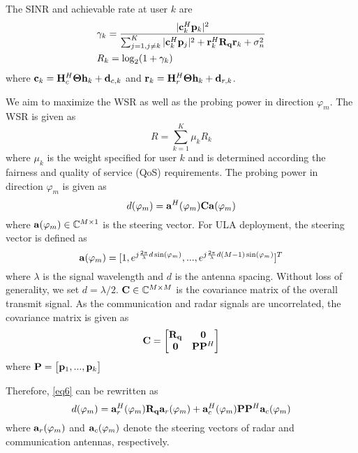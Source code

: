 The SINR and achievable rate at user $k$ are
\begin{align}
    &\gamma_k=\frac{|{\bf c}_k^H {\bf p}_k|^2}{\sum_{j=1,j \neq k}^K |{\bf c}_k^H {\bf p}_j|^2 + {\bf r}_k^H {\bf R}_{\bf q} {\bf r}_k + \sigma^2_n}\\
    &R_k = \log_2 ( 1 + \gamma_k )
\end{align}
where ${\bf c}_k = \mathbf{H}_c^H \mathbf{\Theta} \mathbf{h}_k+ {\bf d}_{c,k}$
and ${\bf r}_k= \mathbf{H}_r^H \mathbf{\Theta} \mathbf{h}_k + {\bf d}_{r,k}$.

We aim to maximize the WSR as well as the probing power in
direction $\varphi_m$. The WSR is given as
\begin{equation}
    R = \sum_{k=1}^K \mu_k R_k \label{eq5}
\end{equation}
where $\mu_k$ is the weight specified for user $k$ and is determined according the fairness and
quality of service (QoS) requirements.
The probing power in direction $\varphi_m$ is given as
\begin{equation}
    d(\varphi_m) = {\bf{a}}^H(\varphi_m) {\bf{C}} {\bf{a}}(\varphi_m) \label{eq6}
\end{equation}
where ${\bf a}(\varphi_m) \in \mathbb{C}^{M \times 1}$ is the steering 
vector. For ULA deployment, the steering vector is defined as
\begin{equation}
    {\bf{a}}(\varphi_m) = [1, e^{j\frac{2\pi}{\lambda}d\sin({\varphi_m})},...,e^{j\frac{2\pi}{\lambda}d(M-1)\sin({\varphi_m})}]^T \label{eq7}
\end{equation}
where $\lambda$ is the signal wavelength and $d$ is the antenna spacing. 
Without loss of generality, we set $d = \lambda / 2$. ${\bf{C}} \in \mathbb{C}^{M \times M}$ is the covariance matrix of 
the overall transmit signal. As the communication
and radar signals are uncorrelated, the covariance matrix is given as 
\begin{equation}
    {\bf{C}} = \left[\begin{matrix}
        {\bf{R}}_{\bf q} & \bf{0}\\
        \bf{0} & {\bf{P}}{\bf{P}}^H
    \end{matrix}\right] \label{eq8}
\end{equation}
where ${\bf P} = \begin{bmatrix} {\bf p}_1,...,{\bf p}_k\end{bmatrix} $

Therefore, \eqref{eq6} can be rewritten as
\begin{equation}
    d(\varphi_m) = {\bf{a}}_r^H(\varphi_m) {\bf{R}}_{\bf q} {\bf{a}}_r(\varphi_m) + {\bf{a}}_c^H(\varphi_m) {\bf{P}}{\bf{P}}^H {\bf{a}}_c(\varphi_m) \label{eq9}
\end{equation}
where ${\bf{a}}_r(\varphi_m)$ and ${\bf{a}}_c(\varphi_m)$ denote the steering vectors
of radar and communication antennas, respectively.

